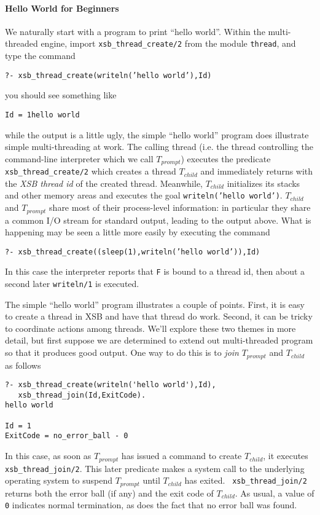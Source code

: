 \paragraph{Hello World for Beginners}
%
We naturally start with a program to print ``hello world''.  Within
the multi-threaded engine, import {\tt xsb\_thread\_create/2} from the
module {\tt thread}, and type the command
\begin{center} 
{\tt ?- xsb\_thread\_create(writeln('hello world'),Id)} 
\end{center} 
you should see something like 
\begin{center} 
{\tt Id = 1hello world} 
\end{center} 
%
while the output is a little ugly, the simple ``hello world'' program
does illustrate simple multi-threading at work.  The calling thread
(i.e. the thread controlling the command-line interpreter which we
call $T_{prompt}$) executes the predicate {\tt xsb\_thread\_create/2}
which creates a thread $T_{child}$ and immediately returns with the
{\em XSB thread id} of the created thread.  Meanwhile, $T_{child}$
initializes its stacks and other memory areas and executes the goal
{\tt writeln('hello world')}.  $T_{child}$ and $T_{prompt}$ share most
of their process-level information: in particular they share a common
I/O stream for standard output, leading to the output above.  What is
happening may be seen a little more easily by executing the command
%
\begin{center} 
{\tt ?- xsb\_thread\_create((sleep(1),writeln('hello world')),Id)} 
\end{center} 
%
In this case the interpreter reports that {\tt F} is bound to a thread
id, then about a second later {\tt writeln/1} is executed.  

The simple ``hello world'' program illustrates a couple of points.
First, it is easy to create a thread in XSB and have that thread do
work.  Second, it can be tricky to coordinate actions among threads.
We'll explore these two themes in more detail, but first suppose we
are determined to extend out multi-threaded program so that it
produces good output.  One way to do this is to {\em join}
$T_{prompt}$ and $T_{child}$ as follows 
%
\begin{verbatim}
?- xsb_thread_create(writeln('hello world'),Id),
   xsb_thread_join(Id,ExitCode).
hello world

Id = 1
ExitCode = no_error_ball - 0
\end{verbatim}
%
In this case, as soon as $T_{prompt}$ has issued a command to create
$T_{child}$, it executes {\tt xsb\_thread\_join/2}.  This later
predicate makes a system call to the underlying operating system to
suspend $T_{prompt}$ until $T_{child}$ has exited.  {\tt
  xsb\_thread\_join/2} returns both the error ball (if any) and the
exit code of $T_{child}$.  As usual, a value of {\tt 0} indicates
normal termination, as does the fact that no error ball was found.

